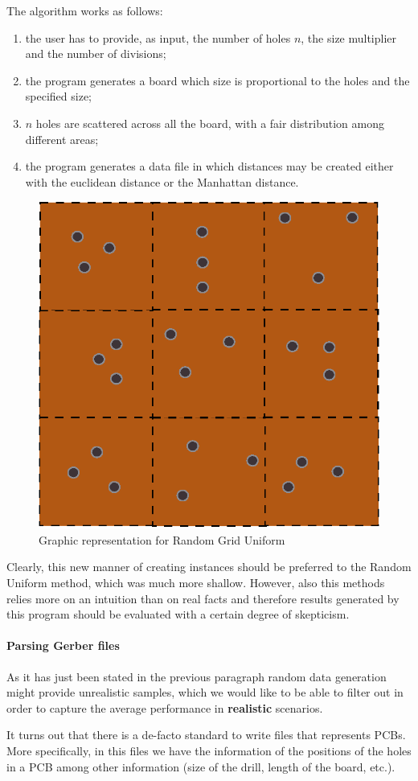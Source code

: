 The algorithm works as follows:
\begin{enumerate}
	\item the user has to provide, as input, the number of holes $n$, the size
	  multiplier and the number of divisions;
	\item the program generates a board which size is proportional to the holes
		and the specified size;
	\item $n$ holes are scattered across all the board, with a fair distribution
	  among different areas;
	\item the program generates a data file in which distances may be created
		either with the euclidean distance or the Manhattan distance.
\end{enumerate}

\begin{figure}[H]
  \centering
  \includegraphics[width=.5\columnwidth]{pics/ru-grid.eps}
  \caption{Graphic representation for Random Grid Uniform}
  \label{fig:ru-grid-sketch}
\end{figure}

Clearly, this new manner of creating instances should be preferred to the
Random Uniform method, which was much more shallow. However, also this methods
relies more on an intuition than on real facts and therefore results generated
by this program should be evaluated with a certain degree of skepticism.

\paragraph{Parsing Gerber files} As it has just been stated in the previous
paragraph random data generation might provide unrealistic samples, which
we would like to be able to filter out in order to capture the average
performance in \textbf{realistic} scenarios.

It turns out that there is a de-facto standard to write files that represents
PCBs. More specifically, in this files we have the information of the positions
of the holes in a PCB among other information (size of the drill, length of the
board, etc.).

